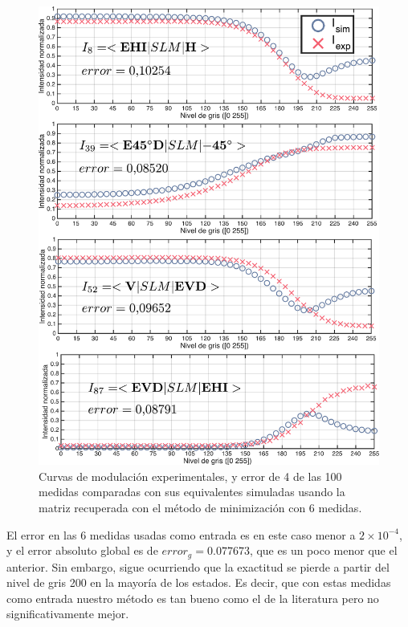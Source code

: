 \begin{figure}[h!]
\centering
\includegraphics[scale=.5]{some_6min_caracterization_results.pdf}
\caption[Curvas de modulación experimentales comparadas con las
simuladas usando el modelo obtenido con el método de minimización de 6
medidas]{Curvas de modulación
  experimentales, y error de 4 de las 100 medidas comparadas con sus
  equivalentes simuladas usando la matriz recuperada con el método de
  minimización con 6 medidas.}
\label{fig:6m_caracterization_results}
\end{figure}
El error en las 6 medidas usadas como entrada es en este caso menor a
$2\times10^{-4}$, y el error absoluto global es de $error_g
=0.077673$, que es un poco menor que el anterior. Sin embargo, sigue ocurriendo que la exactitud se pierde a partir del
nivel de gris 200 en la mayoría de los estados. Es decir, que con estas medidas como entrada
nuestro método es tan bueno como el de la literatura pero no
significativamente mejor.
\pagebreak
